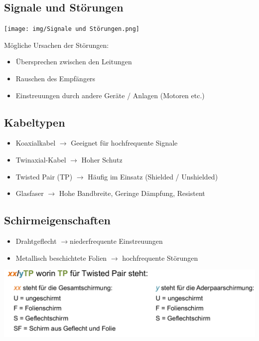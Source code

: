 \subsection{Signale und Störungen}{

    {\texttt{[image: img/Signale und Störungen.png]}}

    Mögliche Ursachen der Störungen:
    \begin{itemize}[noitemsep]
        \item Übersprechen zwischen den Leitungen
        \item Rauschen des Empfängers
        \item Einstreuungen durch andere Geräte / Anlagen (Motoren etc.)
    \end{itemize}

}
\subsection{Kabeltypen}{
    \begin{itemize}[noitemsep]
        \item Koaxialkabel $\to$ Geeignet für hochfrequente Signale
        \item Twinaxial-Kabel $\to$ Hoher Schutz
        \item Twisted Pair (TP) $\to$ Häufig im Einsatz (Shielded / Unshielded)
        \item Glasfaser $\to$ Hohe Bandbreite, Geringe Dämpfung, Resistent
    \end{itemize}
}
\subsection{Schirmeigenschaften}
{ \begin{itemize}[noitemsep]
        \item Drahtgeflecht $\to$niederfrequente Einstreuungen
        \item Metallisch beschichtete Folien $\to$ hochfrequente Störungen
    \end{itemize}}
{   {\includegraphics[scale=.225]{img/twisted.png}}}

